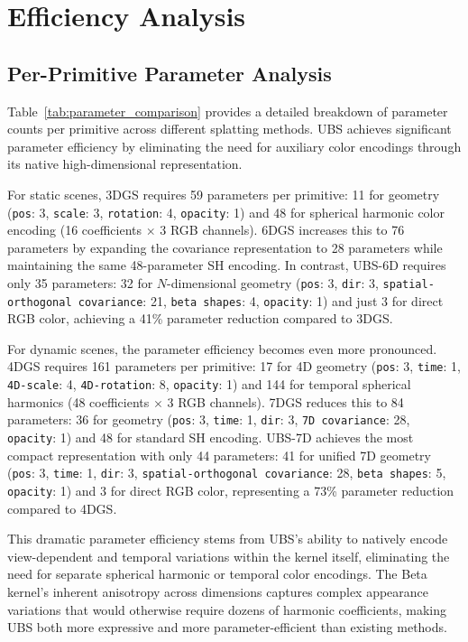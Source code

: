\documentclass{article} %
\begin{document}

\section{Efficiency Analysis}
\label{app:efficiency}

\subsection{Per-Primitive Parameter Analysis}
Table~\ref{tab:parameter_comparison} provides a detailed breakdown of parameter counts per primitive across different splatting methods. UBS achieves significant parameter efficiency by eliminating the need for auxiliary color encodings through its native high-dimensional representation.


For static scenes, 3DGS requires 59 parameters per primitive: 11 for geometry (\texttt{pos}: 3, \texttt{scale}: 3, \texttt{rotation}: 4, \texttt{opacity}: 1) and 48 for spherical harmonic color encoding (16 coefficients $\times$ 3 RGB channels). 6DGS increases this to 76 parameters by expanding the covariance representation to 28 parameters while maintaining the same 48-parameter SH encoding. In contrast, UBS-6D requires only 35 parameters: 32 for $N$-dimensional geometry (\texttt{pos}: 3, \texttt{dir}: 3, \texttt{spatial-orthogonal covariance}: 21, \texttt{beta shapes}: 4, \texttt{opacity}: 1) and just 3 for direct RGB color, achieving a 41\% parameter reduction compared to 3DGS.

For dynamic scenes, the parameter efficiency becomes even more pronounced. 4DGS requires 161 parameters per primitive: 17 for 4D geometry (\texttt{pos}: 3, \texttt{time}: 1, \texttt{4D-scale}: 4, \texttt{4D-rotation}: 8, \texttt{opacity}: 1) and 144 for temporal spherical harmonics (48 coefficients $\times$ 3 RGB channels). 7DGS reduces this to 84 parameters: 36 for geometry (\texttt{pos}: 3, \texttt{time}: 1, \texttt{dir}: 3, \texttt{7D covariance}: 28, \texttt{opacity}: 1) and 48 for standard SH encoding. UBS-7D achieves the most compact representation with only 44 parameters: 41 for unified 7D geometry (\texttt{pos}: 3, \texttt{time}: 1, \texttt{dir}: 3, \texttt{spatial-orthogonal covariance}: 28, \texttt{beta shapes}: 5, \texttt{opacity}: 1) and 3 for direct RGB color, representing a 73\% parameter reduction compared to 4DGS.

This dramatic parameter efficiency stems from UBS's ability to natively encode view-dependent and temporal variations within the kernel itself, eliminating the need for separate spherical harmonic or temporal color encodings. The Beta kernel's inherent anisotropy across dimensions captures complex appearance variations that would otherwise require dozens of harmonic coefficients, making UBS both more expressive and more parameter-efficient than existing methods.
\end{document}
